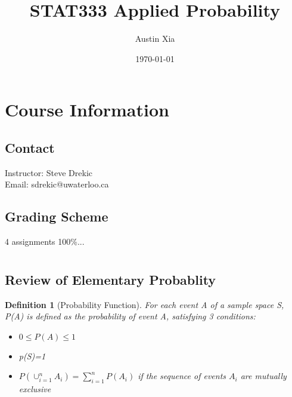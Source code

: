 \documentclass[10pt]{article}
\theoremstyle{break}
\newtheorem{defn}{Definition}[subsection]
\begin{document}
\let\ref\Cref

\title{\bf{STAT333 Applied Probability}}
\date{\today}
\author{Austin Xia}

\maketitle
\newpage
\tableofcontents
\listoffigures
\listoftables
\newpage
\section{Course Information}
    \subsection{Contact}
        \begin{center}
            Instructor: Steve Drekic\\
            Email: sdrekic@uwaterloo.ca
        \end{center}
    \subsection{Grading Scheme}
        \begin{center}
            4 assignments 100\%...\\
        \end{center}
\section{}
    \subsection{Review of Elementary Probablity}
        \begin{defn}[Probability Function]
            For each event A of a sample space S, P(A) is defined as the probability of event A, satisfying 3 conditions:
            \begin{itemize}
                \item $0\leq P(A) \leq 1$
                \item p(S)=1
                \item $P(\cup_{i=1}^nA_i)=\sum^n_{i=1}P(A_i)$ if the sequence of events $A_i$ are mutually exclusive
            \end{itemize}
        \end{defn}
\end{document}
